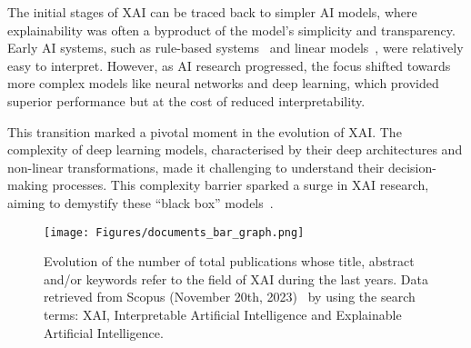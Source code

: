 The initial stages of XAI can be traced back to simpler AI models, where explainability was often a byproduct of the model's simplicity and transparency. Early AI systems, such as rule-based systems~\cite{hayes1985rule} and linear models~\cite{searle1997linear}, were relatively easy to interpret. However, as AI research progressed, the focus shifted towards more complex models like neural networks and deep learning, which provided superior performance but at the cost of reduced interpretability.

This transition marked a pivotal moment in the evolution of XAI. The complexity of deep learning models, characterised by their deep architectures and non-linear transformations, made it challenging to understand their decision-making processes. This complexity barrier sparked a surge in XAI research, aiming to demystify these ``black box'' models~\cite{VandewieleJOTH16, BastaniKB17a, ZhangWZ18a, NguyenYC16, SabourFH17, LinsleySES19, ShiXXCLLG21, SimonyanVZ13, SpringenbergDBR14, Ribeiro0G16, LundbergL17, ElenbergDFK17, Ribeiro0G18, ShrikumarGK17, SundararajanTY17, SmilkovTKVW17, ChattopadhyaySH18, bach2015pixel}.

\begin{figure}[ht!]
\begin{center}
\texttt{[image: Figures/documents\_bar\_graph.png]}
\end{center}
\caption{Evolution of the number of total publications whose title, abstract and/or keywords refer to the field of XAI during the last years. Data retrieved from Scopus (November 20th, 2023)~\cite{Scopus} by using the search terms: XAI, Interpretable Artificial Intelligence and Explainable Artificial Intelligence.}
\label{Fig:XAI}
\end{figure} 

